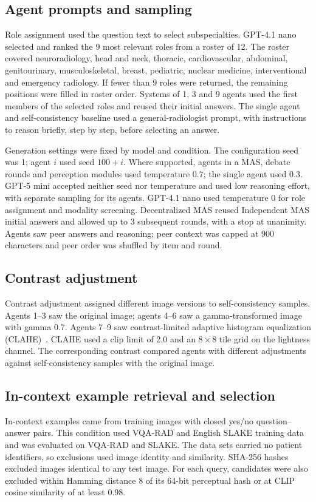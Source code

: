 \subsection{Agent prompts and sampling}
Role assignment used the question text to select subspecialties. GPT-4.1 nano selected and ranked the 9 most relevant roles from a roster of 12. The roster covered neuroradiology, head and neck, thoracic, cardiovascular, abdominal, genitourinary, musculoskeletal, breast, pediatric, nuclear medicine, interventional and emergency radiology. If fewer than 9 roles were returned, the remaining positions were filled in roster order. Systems of 1, 3 and 9 agents used the first members of the selected roles and reused their initial answers. The single agent and self-consistency baseline used a general-radiologist prompt, with instructions to reason briefly, step by step, before selecting an answer.

Generation settings were fixed by model and condition. The configuration seed was 1; agent $i$ used seed $100+i$. Where supported, agents in a MAS, debate rounds and perception modules used temperature 0.7; the single agent used 0.3. GPT-5 mini accepted neither seed nor temperature and used low reasoning effort, with separate sampling for its agents. GPT-4.1 nano used temperature 0 for role assignment and modality screening. Decentralized MAS reused Independent MAS initial answers and allowed up to 3 subsequent rounds, with a stop at unanimity. Agents saw peer answers and reasoning; peer context was capped at 900 characters and peer order was shuffled by item and round.

\subsection{Contrast adjustment}
Contrast adjustment assigned different image versions to self-consistency samples. Agents 1--3 saw the original image; agents 4--6 saw a gamma-transformed image with gamma 0.7. Agents 7--9 saw contrast-limited adaptive histogram equalization (CLAHE)~\cite{zuiderveld1994clahe}. CLAHE used a clip limit of 2.0 and an $8\times8$ tile grid on the lightness channel. The corresponding contrast compared agents with different adjustments against self-consistency samples with the original image.

\subsection{In-context example retrieval and selection}
In-context examples came from training images with closed yes/no question--answer pairs. This condition used VQA-RAD and English SLAKE training data and was evaluated on VQA-RAD and SLAKE. The data sets carried no patient identifiers, so exclusions used image identity and similarity. SHA-256 hashes excluded images identical to any test image. For each query, candidates were also excluded within Hamming distance 8 of its 64-bit perceptual hash or at CLIP cosine similarity of at least 0.98.

